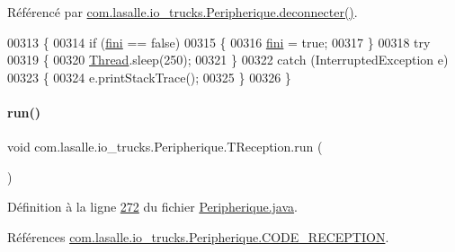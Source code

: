 Référencé par \hyperlink{_peripherique_8java_source_l00235}{com.\+lasalle.\+io\+\_\+trucks.\+Peripherique.\+deconnecter()}.


\begin{DoxyCode}
00313         \{
00314             \textcolor{keywordflow}{if} (\hyperlink{classcom_1_1lasalle_1_1io__trucks_1_1_peripherique_1_1_t_reception_af9ba647e407a9a150e1c37972233dbf9}{fini} == \textcolor{keyword}{false})
00315             \{
00316                 \hyperlink{classcom_1_1lasalle_1_1io__trucks_1_1_peripherique_1_1_t_reception_af9ba647e407a9a150e1c37972233dbf9}{fini} = \textcolor{keyword}{true};
00317             \}
00318             \textcolor{keywordflow}{try}
00319             \{
00320                 \hyperlink{class_thread}{Thread}.sleep(250);
00321             \}
00322             \textcolor{keywordflow}{catch} (InterruptedException e)
00323             \{
00324                 e.printStackTrace();
00325             \}
00326         \}
\end{DoxyCode}
\mbox{\label{classcom_1_1lasalle_1_1io__trucks_1_1_peripherique_1_1_t_reception_a13e01a4a1d897c8643f63494b9f091cc}} 
\paragraph{\texorpdfstring{run()}{run()}}
{\footnotesize\ttfamily void com.\+lasalle.\+io\+\_\+trucks.\+Peripherique.\+T\+Reception.\+run (\begin{DoxyParamCaption}{ }\end{DoxyParamCaption})}



Définition à la ligne \hyperlink{_peripherique_8java_source_l00272}{272} du fichier \hyperlink{_peripherique_8java_source}{Peripherique.\+java}.



Références \hyperlink{_peripherique_8java_source_l00034}{com.\+lasalle.\+io\+\_\+trucks.\+Peripherique.\+C\+O\+D\+E\+\_\+\+R\+E\+C\+E\+P\+T\+I\+ON}.


